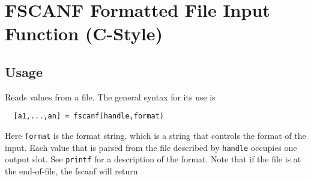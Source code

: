 \section{FSCANF Formatted File Input Function (C-Style)}

\subsection{Usage}

Reads values from a file.  The general syntax for its use is
\begin{verbatim}
  [a1,...,an] = fscanf(handle,format)
\end{verbatim}
Here \verb|format| is the format string, which is a string that
controls the format of the input.  Each value that is parsed from
the file described by \verb|handle| occupies one output slot.
See \verb|printf| for a description of the format.  Note that if
the file is at the end-of-file, the fscanf will return 
